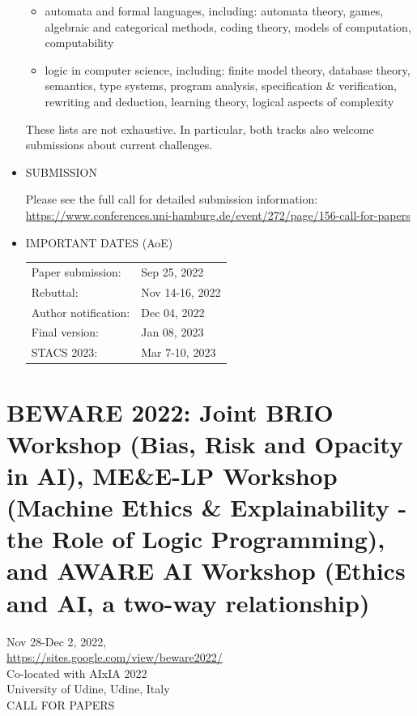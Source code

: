 \documentclass[prodmode,acmtecs]{acmsmall} %
\begin{document}
\begin{itemize}
\begin{itemize}\item  automata and formal languages, including: automata theory, games, algebraic and categorical methods, coding theory, models of computation, computability 
\item  logic in computer science, including: finite model theory, database theory, semantics, type systems, program analysis, specification \& verification, rewriting and deduction, learning theory, logical aspects of complexity
\end{itemize} 
  These lists are not exhaustive. In particular, both tracks also welcome submissions about current challenges. 
 
\item  SUBMISSION 
 
  Please see the full call for detailed submission information: \href{https://www.conferences.uni-hamburg.de/event/272/page/156-call-for-papers}{https://www.conferences.uni-hamburg.de/event/272/page/156-call-for-papers} 
 
\item  IMPORTANT DATES (AoE) 
 
\begin{tabulary}{\linewidth}{LL}Paper submission:  & Sep 25, 2022 \\
Rebuttal:  & Nov 14-16, 2022 \\
Author notification:  & Dec 04, 2022 \\
Final version:  & Jan 08, 2023 \\
STACS 2023:  & Mar 7-10, 2023 \\
\end{tabulary}
 
\end{itemize}\section{BEWARE 2022: Joint BRIO Workshop (Bias, Risk and Opacity in AI), ME\&E-LP Workshop (Machine Ethics \& Explainability - the Role of Logic Programming), and AWARE AI Workshop (Ethics and AI, a two-way relationship)}\label{BEWARE2022}  Nov 28-Dec 2, 2022,\\ 
  \href{https://sites.google.com/view/beware2022/}{https://sites.google.com/view/beware2022/} \\ 
  Co-located with AIxIA 2022\\ 
  University of Udine, Udine, Italy\\ 
CALL FOR PAPERS 
\end{document}
